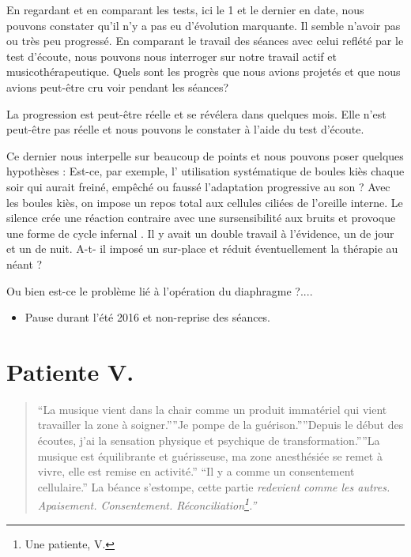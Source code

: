 En regardant et en comparant les tests, ici le 1\textdegree{} et le
dernier en date, nous pouvons constater qu'il n'y a pas eu d'évolution
marquante. Il semble n'avoir pas ou très peu progressé. En comparant
le travail des séances avec celui reflété par le test d'écoute, nous
pouvons nous interroger sur notre travail actif et musicothérapeutique.
Quels sont les progrès que nous avions projetés et que nous avions
peut-être cru voir pendant les séances? 

La progression est peut-être réelle et se révélera dans quelques mois.
Elle n'est peut-être pas réelle et nous pouvons le constater à l'aide
du test d'écoute. 

Ce dernier nous interpelle sur beaucoup de points et nous pouvons
poser quelques hypothèses : Est-ce, par exemple, l' utilisation systématique
de boules kiès chaque soir qui aurait freiné, empêché ou faussé l'adaptation
progressive au son ? Avec les boules kiès, on impose un repos total
aux cellules ciliées de l'oreille interne. Le silence crée une réaction
contraire avec une sursensibilité aux bruits et provoque une forme
de cycle infernal . Il y avait un double travail à l'évidence, un
de jour et un de nuit. A-t- il imposé un sur-place et réduit éventuellement
la thérapie au néant ?

Ou bien est-ce le problème lié à l'opération du diaphragme ?....
\begin{itemize}
\item Pause durant l'été 2016 et non-reprise des séances.
\end{itemize}

\section{Patiente V.}
\begin{quotation}
``La musique vient dans la chair comme un produit immatériel
qui vient travailler la zone à soigner.''{}''Je pompe de la guérison.''{}''Depuis
le début des écoutes, j'ai la sensation physique et psychique de transformation.''{}''La
musique est équilibrante et guérisseuse, ma zone anesthésiée se remet
à vivre, elle est remise en activité.'' ``Il y a comme un consentement
cellulaire.'' La béance s'estompe, cette partie \emph{redevient
comme les autres. Apaisement. Consentement. Réconciliation\footnote{Une patiente, V.}.''}
\end{quotation}



